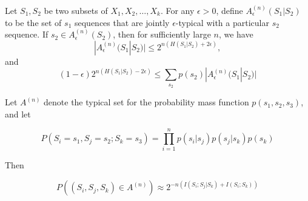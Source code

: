 %
%
\begin{tcolorbox}[boxrule=0pt,frame hidden,sharp corners,enhanced, opacityback=0, borderline west={2pt}{0pt}{blue}]
\begin{thm}Let \( S_1, S_2 \) be two subsets of \( X_1, X_2, \ldots, X_k \). For any
\( \epsilon > 0 \), define \( A^{(n)}_\epsilon(S_1 | S_2) \) to be the set of \( s_1 \) sequences that are jointly
\( \epsilon \)-typical with a particular \( s_2 \) sequence. If \( s_2 \in A^{(n)}_\epsilon(S_2) \), then for sufficiently large \( n \), we have
\begin{equation}
    |A^{(n)}_\epsilon(S_1 | S_2)| \leq 2^{n(H(S_1 | S_2) + 2\epsilon)},
\end{equation}
and
\begin{equation}
    (1 - \epsilon) 2^{n(H(S_1 | S_2) - 2\epsilon)} \leq \sum_{s_2} p(s_2) |A^{(n)}_\epsilon(S_1 | S_2)|
\end{equation}
\end{thm}
\end{tcolorbox}
%
%
\begin{tcolorbox}[boxrule=0pt,frame hidden,sharp corners,enhanced, opacityback=0, borderline west={2pt}{0pt}{blue}]
\begin{thm}Let \( A^{(n)} \) denote the typical set for the probability mass function \( p(s_1, s_2, s_3) \), and let

\begin{equation}
P(S_i = s_1, S_j = s_2; S_k = s_3) = \prod_{i=1}^{n} p(s_{i} | s_{j}) p(s_{j} | s_{k}) p(s_{k})
\end{equation}

Then

\begin{equation}
P\left((S_i, S_j, S_k) \in A^{(n)}\right) \approx 2^{-n(I(S_i; S_j | S_k) + I(S_i; S_k))}
\end{equation}
\end{thm}
\end{tcolorbox}
%
